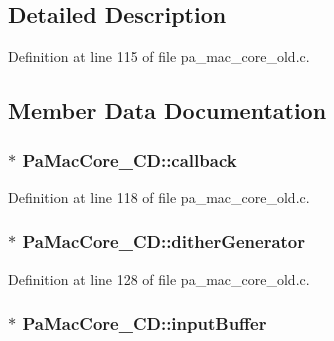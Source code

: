 \subsection{Detailed Description}


Definition at line 115 of file pa\+\_\+mac\+\_\+core\+\_\+old.\+c.



\subsection{Member Data Documentation}
\subsubsection[{\texorpdfstring{callback}{callback}}]{$\ast$ Pa\+Mac\+Core\+\_\+\+C\+D\+::callback}\hypertarget{struct_pa_mac_core___c_d_a024b45fca6d1eabbdde8f50a5e883424}{}\label{struct_pa_mac_core___c_d_a024b45fca6d1eabbdde8f50a5e883424}


Definition at line 118 of file pa\+\_\+mac\+\_\+core\+\_\+old.\+c.

\subsubsection[{\texorpdfstring{dither\+Generator}{ditherGenerator}}]{$\ast$ Pa\+Mac\+Core\+\_\+\+C\+D\+::dither\+Generator}\hypertarget{struct_pa_mac_core___c_d_ae11eee81379e25fb2ca527dc053a7687}{}\label{struct_pa_mac_core___c_d_ae11eee81379e25fb2ca527dc053a7687}


Definition at line 128 of file pa\+\_\+mac\+\_\+core\+\_\+old.\+c.

\subsubsection[{\texorpdfstring{input\+Buffer}{inputBuffer}}]{$\ast$ Pa\+Mac\+Core\+\_\+\+C\+D\+::input\+Buffer}\hypertarget{struct_pa_mac_core___c_d_aca96e90a66ea42995adfc2f685fec7ce}{}\label{struct_pa_mac_core___c_d_aca96e90a66ea42995adfc2f685fec7ce}


